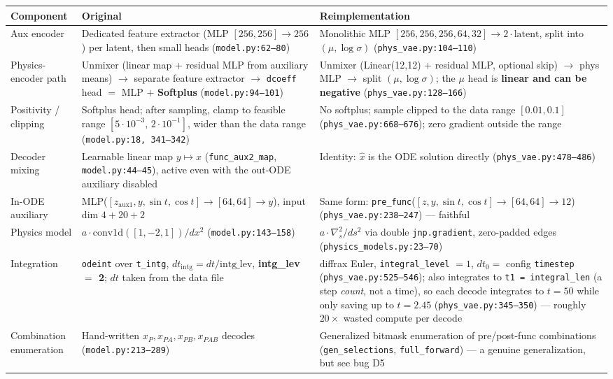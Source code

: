 \documentclass[11pt,a4paper]{article}
\newcommand{\code}[1]{\texttt{#1}}
\begin{document}
\begin{table}[h]
\centering
\small
\begin{tabularx}{\textwidth}{LXX}
\toprule
\textbf{Component} & \textbf{Original} & \textbf{Reimplementation} \\
\midrule
Aux encoder & Dedicated feature extractor (MLP $[256,256] \to 256$) per latent, then small heads (\code{model.py:62--80}) & Monolithic MLP $[256,256,256,64,32] \to 2\cdot\text{latent}$, split into $(\mu, \log\sigma)$ (\code{phys\_vae.py:104--110}) \\
Physics-encoder path & Unmixer (linear map + residual MLP from auxiliary means) $\to$ separate feature extractor $\to$ \code{dcoeff} head $=$ MLP $+$ \textbf{Softplus} (\code{model.py:94--101}) & Unmixer (Linear(12,12) + residual MLP, optional skip) $\to$ phys MLP $\to$ split $(\mu,\log\sigma)$; the $\mu$ head is \textbf{linear and can be negative} (\code{phys\_vae.py:128--166}) \\
Positivity / clipping & Softplus head; after sampling, clamp to feasible range $[5\cdot10^{-3},\,2\cdot10^{-1}]$, wider than the data range (\code{model.py:18, 341--342}) & No softplus; sample clipped to the data range $[0.01, 0.1]$ (\code{phys\_vae.py:668--676}); zero gradient outside the range \\
Decoder mixing & Learnable linear map $y \mapsto x$ (\code{func\_aux2\_map}, \code{model.py:44--45}), active even with the out-ODE auxiliary disabled & Identity: $\hat{x}$ is the ODE solution directly (\code{phys\_vae.py:478--486}) \\
In-ODE auxiliary & MLP($[z_{\mathrm{aux1}}, y, \sin t, \cos t] \to [64,64] \to y$), input dim $4+20+2$ & Same form: \code{pre\_func}($[z, y, \sin t, \cos t] \to [64,64] \to 12$) (\code{phys\_vae.py:238--247}) --- faithful \\
Physics model & $a \cdot \mathrm{conv1d}([1,-2,1])/dx^2$ (\code{model.py:143--158}) & $a \cdot \nabla^2_s / ds^2$ via double \code{jnp.gradient}, zero-padded edges (\code{physics\_models.py:23--70}) \\
Integration & \code{odeint} over \code{t\_intg}, $dt_\mathrm{intg} = dt/\mathrm{intg\_lev}$, \textbf{intg\_lev $=$ 2}; $dt$ taken from the data file & diffrax Euler, \code{integral\_level} $=1$, $dt_0 =$ config \code{timestep} (\code{phys\_vae.py:525--546}); also integrates to \code{t1 = integral\_len} (a step \emph{count}, not a time), so each decode integrates to $t=50$ while only saving up to $t = 2.45$ (\code{phys\_vae.py:345--350}) --- roughly $20\times$ wasted compute per decode \\
Combination enumeration & Hand-written $x_P, x_{PA}, x_{PB}, x_{PAB}$ decodes (\code{model.py:213--289}) & Generalized bitmask enumeration of pre/post-func combinations (\code{gen\_selections}, \code{full\_forward}) --- a genuine generalization, but see bug D5 \\
\bottomrule
\end{tabularx}
\end{table}
\end{document}
